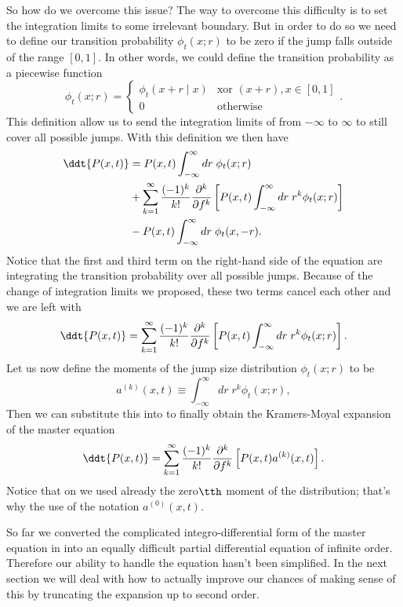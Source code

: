 So how do we overcome this issue? The way to overcome this difficulty is to
set the integration limits to some irrelevant boundary. But in order to do so
we need to define our transition probability $\phi_t(x; r)$ to be zero if the
jump falls outside of the range $[0, 1]$. In other words, we could define the
transition probability as a piecewise function
\begin{equation}
  \phi_t(x; r) =
  \begin{cases}
    \phi_t(x + r \mid x)& \text{xor } (x + r), x \in [0, 1] \\
    0& \text{otherwise}
  \end{cases}.
\end{equation}
This definition allow us to send the integration limits of
 from $-\infty$ to $\infty$ to still cover all possible
jumps. With this definition we then have
\begin{equation}
  \begin{split}
    \ddt{P(x, t)} &= P(x, t)\int^\infty_{- \infty} dr \; \phi_t(x; r) \\
    &+
    \sum_{k=1}^\infty {(-1)^k \over k!} {\partial^k \over \partial f^k}
    \left[
    P(x, t) \int_{-\infty}^\infty dr \; r^k \phi_t(x; r)
    \right] \\
    &-
    P(x, t) \int_{-\infty}^\infty dr \; \phi_t(x, -r).
  \end{split}
\end{equation}
Notice that the first and third term on the right-hand side of the equation are
integrating the transition probability over all possible jumps. Because of the
change of integration limits we proposed, these two terms cancel each other and
we are left with
\begin{equation}
  \ddt{P(x, t)} = \sum_{k=1}^\infty {(-1)^k \over k!}
  {\partial^k \over \partial f^k}
  \left[
  P(x, t) \int_{-\infty}^\infty dr \; r^k \phi_t(x; r)
  \right].
  \label{eq_almost_km}
\end{equation}
Let us now define the moments of the jump size distribution $\phi_t(x; r)$ to
be
\begin{equation}
  a^{(k)}(x, t) \equiv \int_{-\infty}^\infty dr \; r^k \phi_t(x; r),
  \label{eq_jump_mom}
\end{equation}
Then we can substitute this into  to finally obtain the
Kramers-Moyal expansion of the master equation
\begin{equation}
  \ddt{P(x, t)} = \sum_{k=1}^\infty {(-1)^k \over k!}
  {\partial^k \over \partial f^k}
  \left[
  P(x, t) a^{(k)}(x, t)
  \right].
  \label{eq_km_expansion}
\end{equation}
Notice that on  we used already the zero$\tth$
moment of the distribution; that's why the use of the notation $a^{(0)}(x, t)$.

So far we converted the complicated integro-differential form of the master
equation in  into an equally difficult partial
differential equation of infinite order. Therefore our ability to handle the
equation hasn't been simplified. In the next section we will deal with how to
actually improve our chances of making sense of this by truncating the
expansion up to second order.
